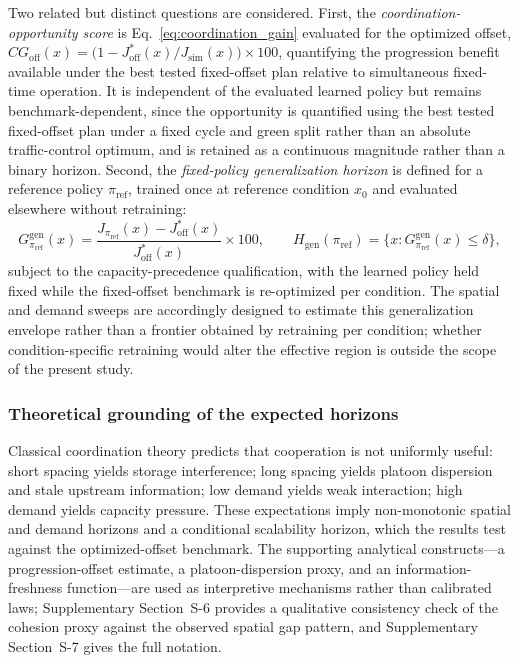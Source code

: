 \documentclass[review,12pt]{elsarticle}
\begin{document}
Two related but distinct questions are considered. First, the
\emph{coordination-opportunity score} is Eq.~\eqref{eq:coordination_gain}
evaluated for the optimized offset,
$CG_{\mathrm{off}}(x)=\bigl(1-J_{\mathrm{off}}^{*}(x)/J_{\mathrm{sim}}(x)\bigr)\times100$,
quantifying the progression benefit available under the best tested
fixed-offset plan relative to simultaneous fixed-time operation. It is
independent of the evaluated learned policy but remains benchmark-dependent,
since the opportunity is quantified using the best tested fixed-offset plan
under a fixed cycle and green split rather than an absolute traffic-control
optimum, and is retained as a continuous magnitude rather than a binary
horizon. Second, the \emph{fixed-policy generalization horizon} is defined for
a reference policy $\pi_{\mathrm{ref}}$, trained once at reference condition
$x_0$ and evaluated elsewhere without retraining:
\begin{equation}
G^{\mathrm{gen}}_{\pi_{\mathrm{ref}}}(x)=
\frac{J_{\pi_{\mathrm{ref}}}(x)-J_{\mathrm{off}}^{*}(x)}{J_{\mathrm{off}}^{*}(x)}
\times 100,\qquad
H_{\mathrm{gen}}(\pi_{\mathrm{ref}})=\{x : G^{\mathrm{gen}}_{\pi_{\mathrm{ref}}}(x)\leq\delta\},
\label{eq:gen_horizon}
\end{equation}
subject to the capacity-precedence qualification, with the learned policy held
fixed while the fixed-offset benchmark is re-optimized per condition. The spatial and demand sweeps are accordingly designed to estimate this
generalization envelope rather than a frontier obtained by retraining per
condition; whether condition-specific retraining would alter the effective
region is outside the scope of the present study.
\subsubsection{Theoretical grounding of the expected horizons}
\label{subsubsec:classical_prediction}

Classical coordination theory predicts that cooperation is not uniformly useful: short spacing yields storage interference; long spacing yields platoon dispersion and stale upstream information; low demand yields weak interaction; high demand yields capacity pressure. These expectations imply non-monotonic spatial and demand horizons and a conditional scalability horizon, which the results test against the optimized-offset benchmark. The supporting analytical constructs---a progression-offset estimate, a platoon-dispersion proxy, and an information-freshness function---are used as interpretive mechanisms rather than calibrated laws; Supplementary Section~S-6 provides a qualitative consistency check of the cohesion proxy against the observed spatial gap pattern, and Supplementary Section~S-7 gives the full notation.
\end{document}
